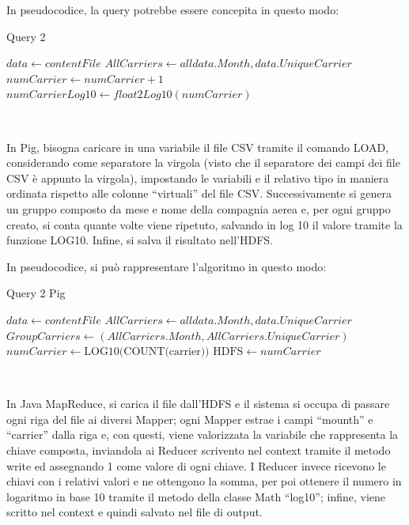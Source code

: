 \documentclass[11pt]{article} %
\begin{document}
In pseudocodice, la query potrebbe essere concepita in questo modo:

\begin{algorithm}
\caption{Query 2}\label{euclid}
\begin{algorithmic}[0]
\State $data \gets contentFile$
\State $AllCarriers \gets all data.Month, data.UniqueCarrier$
\State $numCarrier \gets numCarrier + 1$
\State $numCarrierLog10 \gets float2Log10(numCarrier)$
\EndFor
\end{algorithmic}
\end{algorithm}

~

In Pig, bisogna caricare in una variabile il file CSV tramite il comando LOAD, considerando come separatore la virgola (visto che il separatore dei campi dei file CSV è appunto la virgola), impostando le variabili e il relativo tipo in maniera ordinata rispetto alle colonne ``virtuali'' del file CSV. Successivamente si genera un gruppo composto da mese e nome della compagnia aerea e, per ogni gruppo creato, si conta quante volte viene ripetuto, salvando in log 10 il valore tramite la funzione LOG10. Infine, si salva il risultato nell'HDFS.

In pseudocodice, si può rappresentare l'algoritmo in questo modo:

\begin{algorithm}
\caption{Query 2 Pig}\label{euclid}
\begin{algorithmic}[0]
\State $data \gets contentFile$
\State $AllCarriers \gets all data.Month, data.UniqueCarrier$
\State $GroupCarriers \gets (AllCarriers.Month, AllCarriers.UniqueCarrier)$
	\State $numCarrier \gets \text{LOG10(COUNT(carrier))}$
\EndFor
\State $\text{HDFS}\gets numCarrier$
\end{algorithmic}
\end{algorithm}

~

In Java MapReduce, si carica il file dall'HDFS e il sistema si occupa di passare ogni riga del file ai diversi Mapper; ogni Mapper estrae i campi ``mounth'' e ``carrier'' dalla riga e, con questi, viene valorizzata la variabile che rappresenta la chiave composta, inviandola ai Reducer scrivento nel context tramite il metodo write ed assegnando 1 come valore di ogni chiave. I Reducer invece ricevono le chiavi con i relativi valori e ne ottengono la somma, per poi ottenere il numero in logaritmo in base 10 tramite il metodo della classe Math ``log10''; infine, viene scritto nel context e quindi salvato nel file di output.
\end{document}
